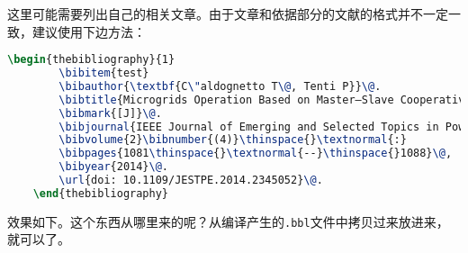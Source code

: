 

这里可能需要列出自己的相关文章。由于文章和依据部分的文献的格式并不一定一致，建议使用下边方法：
\begin{lstlisting}[language=tex, basicstyle=\ttfamily\tiny, keywordstyle=\color{blue}, commentstyle=\color{gray}]
	\begin{thebibliography}{1}
		\bibitem{test}
		\bibauthor{\textbf{C\"aldognetto T\@, Tenti P}}\@. 
		\bibtitle{Microgrids Operation Based on Master–Slave Cooperative Control}
		\bibmark{[J]}\@.
		\bibjournal{IEEE Journal of Emerging and Selected Topics in Power Electronics}\@,
		\bibvolume{2}\bibnumber{(4)}\thinspace{}\textnormal{:}
		\bibpages{1081\thinspace{}\textnormal{--}\thinspace{}1088}\@,
		\bibyear{2014}\@.
		\url{doi: 10.1109/JESTPE.2014.2345052}\@.
	\end{thebibliography}
\end{lstlisting}
效果如下。这个东西从哪里来的呢？从编译产生的\verb|.bbl|文件中拷贝过来放进来，就可以了。
